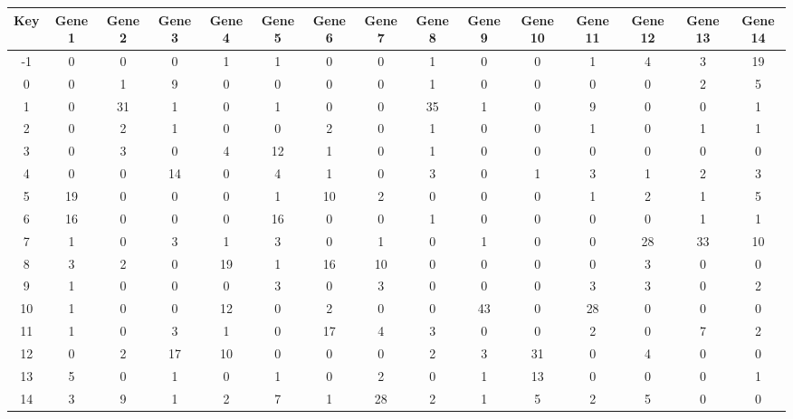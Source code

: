 \begin{tabular}{|c|c|c|c|c|c|c|c|c|c|c|c|c|c|c|}
\hline
Key & Gene 1 & Gene 2 & Gene 3 & Gene 4 & Gene 5 & Gene 6 & Gene 7 & Gene 8 & Gene 9 & Gene 10 & Gene 11 & Gene 12 & Gene 13 & Gene 14 \\
\hline
-1 & 0 & 0 & 0 & 1 & 1 & 0 & 0 & 1 & 0 & 0 & 1 & 4 & 3 & 19 \\
0 & 0 & 1 & 9 & 0 & 0 & 0 & 0 & 1 & 0 & 0 & 0 & 0 & 2 & 5 \\
1 & 0 & 31 & 1 & 0 & 1 & 0 & 0 & 35 & 1 & 0 & 9 & 0 & 0 & 1 \\
2 & 0 & 2 & 1 & 0 & 0 & 2 & 0 & 1 & 0 & 0 & 1 & 0 & 1 & 1 \\
3 & 0 & 3 & 0 & 4 & 12 & 1 & 0 & 1 & 0 & 0 & 0 & 0 & 0 & 0 \\
4 & 0 & 0 & 14 & 0 & 4 & 1 & 0 & 3 & 0 & 1 & 3 & 1 & 2 & 3 \\
5 & 19 & 0 & 0 & 0 & 1 & 10 & 2 & 0 & 0 & 0 & 1 & 2 & 1 & 5 \\
6 & 16 & 0 & 0 & 0 & 16 & 0 & 0 & 1 & 0 & 0 & 0 & 0 & 1 & 1 \\
7 & 1 & 0 & 3 & 1 & 3 & 0 & 1 & 0 & 1 & 0 & 0 & 28 & 33 & 10 \\
8 & 3 & 2 & 0 & 19 & 1 & 16 & 10 & 0 & 0 & 0 & 0 & 3 & 0 & 0 \\
9 & 1 & 0 & 0 & 0 & 3 & 0 & 3 & 0 & 0 & 0 & 3 & 3 & 0 & 2 \\
10 & 1 & 0 & 0 & 12 & 0 & 2 & 0 & 0 & 43 & 0 & 28 & 0 & 0 & 0 \\
11 & 1 & 0 & 3 & 1 & 0 & 17 & 4 & 3 & 0 & 0 & 2 & 0 & 7 & 2 \\
12 & 0 & 2 & 17 & 10 & 0 & 0 & 0 & 2 & 3 & 31 & 0 & 4 & 0 & 0 \\
13 & 5 & 0 & 1 & 0 & 1 & 0 & 2 & 0 & 1 & 13 & 0 & 0 & 0 & 1 \\
14 & 3 & 9 & 1 & 2 & 7 & 1 & 28 & 2 & 1 & 5 & 2 & 5 & 0 & 0 \\
\hline
\end{tabular}